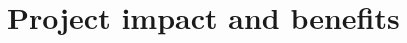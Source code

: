 \documentclass[a4paper,11pt]{article}
\begin{document}
\section{Project impact and benefits}

\pagebreak
\section*{\bibname}
\printbibliography[heading=none]
\end{document}
